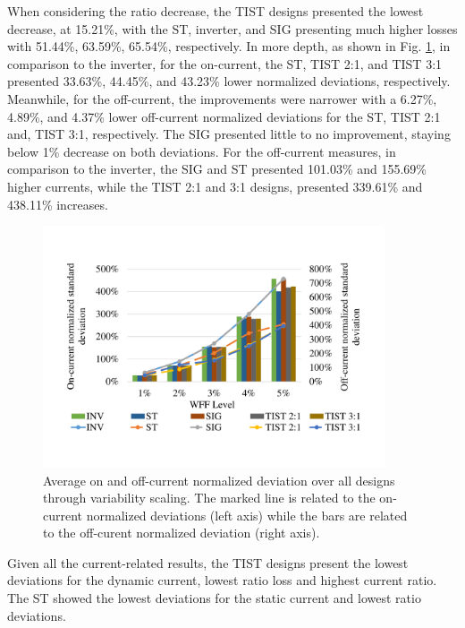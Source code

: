 \documentclass[pgmicro,diss,english]{iiufrgs}
\begin{document}
When considering the ratio decrease, the TIST designs presented the lowest decrease, at 15.21\%, with the ST, inverter, and SIG presenting much higher losses with 51.44\%, 63.59\%, 65.54\%, respectively. In more depth, as shown in Fig. \ref{fig:OnOffDev}, in comparison to the inverter, for the on-current, the ST, TIST 2:1, and TIST 3:1 presented 33.63\%, 44.45\%, and 43.23\% lower normalized deviations, respectively. Meanwhile, for the off-current, the improvements were narrower with a 6.27\%, 4.89\%, and 4.37\% lower off-current normalized deviations for the ST, TIST 2:1 and, TIST 3:1, respectively. The SIG presented little to no improvement, staying below 1\% decrease on both deviations. For the off-current measures, in comparison to the inverter, the SIG and ST presented 101.03\% and 155.69\% higher currents, while the TIST 2:1 and 3:1 designs, presented 339.61\% and 438.11\% increases.

    \begin{figure}[]
        \centering
            \includegraphics[width=0.9\textwidth, trim={1.25cm 1cm 2cm 3cm}, clip]{compOnOffCurr.pdf}
            \caption{Average on and off-current normalized deviation over all designs through variability scaling. The marked line is related to the on-current normalized deviations (left axis) while the bars are related to the off-curent normalized deviation (right axis).}
        \label{fig:OnOffDev}
    \end{figure}


Given all the current-related results, the TIST designs present the lowest deviations for the dynamic current, lowest ratio loss and highest current ratio. The ST showed the lowest deviations for the static current and lowest ratio deviations.
\end{document}
